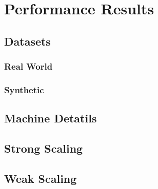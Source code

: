 
\section{Performance Results} \label{sec:experiments}

\subsection{Datasets}

\subsubsection{Real World}
\subsubsection{Synthetic}

\subsection{Machine Detatils}

\subsection{Strong Scaling}

\subsection{Weak Scaling}
